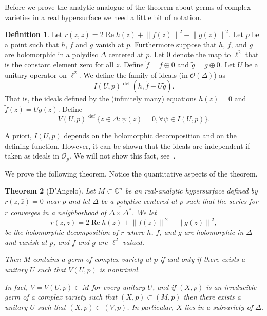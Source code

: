 \documentclass[12pt,openany]{book}
\renewcommand{\Re}{\operatorname{Re}}
\newcommand{\norm}[1]{\left\lVert {#1} \right\rVert}
\newcommand{\C}{{\mathbb{C}}}
\newcommand{\sO}{{\mathcal{O}}}
\theoremstyle{plain}
\newtheorem{thm}{Theorem}[section]
\theoremstyle{remark}
\theoremstyle{definition}
\newtheorem{defn}[thm]{Definition}
\theoremstyle{exercise}
\theoremstyle{example}
\begin{document}
Before we prove the analytic analogue of the theorem about germs of complex
varieties in a real hypersurface we need a little bit of notation.

\begin{defn} \label{idealsUdef}
Let $r(z,\bar{z}) = 2 \Re h(z) + \norm{f(z)}^2 - \norm{g(z)}^2$.  Let $p$
be a point such that $h$, $f$ and $g$ vanish at $p$.  Furthermore
suppose that $h$, $f$, and $g$ are holomorphic in a polydisc $\Delta$
centered at $p$.  Let $0$ denote the map to $\ell^2$ that is the constant
element zero for all $z$.  Define $\tilde{f} = f \oplus 0$ and
$\tilde{g} = g \oplus 0$.  Let $U$ be a unitary operator on $\ell^2$.
We define the family of ideals (in $\sO(\Delta)$) as
\begin{equation}
I(U,p) \overset{\mathrm{def}}{=} (h,\tilde{f} - U \tilde{g}) .
\end{equation}
That is, the ideals defined by the (infinitely many) equations $h(z) = 0$ and
$\tilde{f}(z) = U \tilde{g}(z)$.
Define
\begin{equation}
V(U,p) \overset{\mathrm{def}}{=} \{ z \in \Delta : \psi(z) = 0, \forall \psi
\in I(U,p) \} .
\end{equation}
\end{defn}

A priori, $I(U,p)$ depends on the holomorphic decomposition and on the
defining function.  However, it can be shown that the ideals are independent
if taken as ideals in $\sO_p$.
We will not show this fact, see~\cite{DAngelo}.

We prove the following theorem.
Notice the quantitative aspects of the theorem.

\begin{thm}[D'Angelo] \label{thm:holinm}
Let $M \subset \C^n$ be an real-analytic hypersurface defined by
$r(z,\bar{z}) = 0$ near $p$ and let $\Delta$ be a polydisc centered at $p$
such that the series for $r$ converges in a neighborhood of
$\overline{\Delta \times \Delta^*}$.  We let
\begin{equation}
r(z,\bar{z}) = 2 \Re h(z) + \norm{f(z)}^2-\norm{g(z)}^2 ,
\end{equation}
be the holomorphic decomposition of $r$
where $h$, $f$, and $g$ are holomorphic in $\Delta$ and vanish at $p$, and $f$
and $g$ are $\ell^2$ valued.

Then $M$ contains a germ of complex
variety at $p$ if and only if there exists a unitary $U$
such that $V(U,p)$ is nontrivial.

In fact, $V=V(U,p) \subset M$ for every unitary $U$, and if $(X,p)$
is an irreducible germ of a complex variety such that $(X,p) \subset (M,p)$
then there exists a unitary $U$ such that $(X,p) \subset (V,p)$.
In particular, $X$ lies in a subvariety of $\Delta$.
\end{thm}
\end{document}
